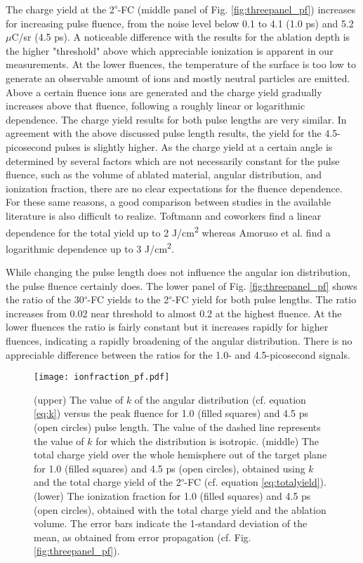\documentclass[aip, jap, reprint, amsmath, amssymb]{revtex4-1}
\begin{document}
The charge yield at the 2\textsuperscript{$\circ$}-FC (middle panel of Fig. \ref{fig:threepanel_pf}) increases for increasing pulse fluence, from the noise level below 0.1 to 4.1 (1.0 ps) and 5.2 $\mu$C/sr (4.5 ps). A noticeable difference with the results for the ablation depth is the higher "threshold" above which appreciable ionization is apparent in our measurements. At the lower fluences, the temperature of the surface is too low to generate an observable amount of ions and mostly neutral particles are emitted. Above a certain fluence ions are generated and the charge yield gradually increases above that fluence, following a roughly linear or logarithmic dependence. The charge yield results for both pulse lengths are very similar. In agreement with the above discussed pulse length results, the yield for the 4.5-picosecond pulses is slightly higher. As the charge yield at a certain angle is determined by several factors which are not necessarily constant for the pulse fluence, such as the volume of ablated material, angular distribution, and ionization fraction, there are no clear expectations for the fluence dependence. For these same reasons, a good comparison between studies in the available literature is also difficult to realize. Toftmann and coworkers\cite{toftmann2013} find a linear dependence for the total yield up to 2 J/cm\textsuperscript{2} whereas Amoruso et al. \cite{amoruso2000,amoruso2002} find a logarithmic dependence up to 3 J/cm\textsuperscript{2}. 

While changing the pulse length does not influence the angular ion distribution, the pulse fluence certainly does. The lower panel of Fig. \ref{fig:threepanel_pf} shows the ratio of the 30\textsuperscript{$\circ$}-FC yields to the 2\textsuperscript{$\circ$}-FC yield for both pulse lengths. The ratio increases from 0.02 near threshold to almost 0.2 at the highest fluence. At the lower fluences the ratio is fairly constant but it increases rapidly for higher fluences, indicating a rapidly broadening of the angular distribution. There is no appreciable difference between the ratios for the 1.0- and 4.5-picosecond signals. 

\begin{figure}[]
\texttt{[image: ionfraction\_pf.pdf]}
\caption{(upper) The value of $k$ of the angular distribution (cf. equation \ref{eq:k}) versus the peak fluence for 1.0 (filled squares) and 4.5 ps (open circles) pulse length. The value of the dashed line represents the value of $k$ for which the distribution is isotropic.
(middle) The total charge yield over the whole hemisphere out of the target plane for 1.0 (filled squares) and 4.5 ps (open circles), obtained using $k$ and the total charge yield of the 2\textsuperscript{$\circ$}-FC (cf. equation \ref{eq:totalyield}).
(lower) The ionization fraction for 1.0 (filled squares) and 4.5 ps (open circles), obtained with the total charge yield and the ablation volume. The error bars indicate the 1-standard deviation of the mean, as obtained from error propagation (cf. Fig. \ref{fig:threepanel_pf}).}
\label{fig:ionfraction_pf}
\end{figure}
\end{document}
